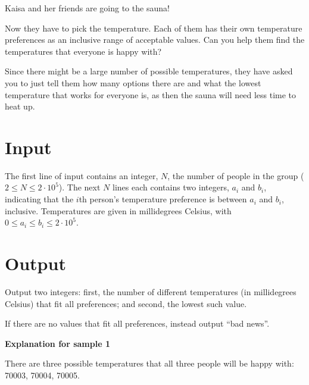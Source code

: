 
Kaisa and her friends are going to the sauna!

Now they have to pick the temperature. Each of them has their own temperature
preferences as an inclusive range of acceptable values. Can you help them find
the temperatures that everyone is happy with?

Since there might be a large number of possible temperatures, they have asked
you to just tell them how many options there are and what the lowest temperature
that works for everyone is, as then the sauna will need less time to heat up.

\section*{Input}

The first line of input contains an integer, $N$, the number of people in the group ($2 \le N \le 2 \cdot 10^5$).
The next $N$ lines each contains two integers, $a_i$ and $b_i$, indicating that
the $i$th person's temperature preference is between $a_i$ and $b_i$, inclusive. 
Temperatures are given in millidegrees Celsius, with $0 \le a_i \le b_i \le 2 \cdot 10^5$.

\section*{Output}

Output two integers: first, the number of different temperatures (in millidegrees
Celsius) that fit all preferences; and second, the lowest such value.

If there are no values that fit all preferences, instead output ``bad news''.

\textbf{Explanation for sample 1}

There are three possible temperatures that all three people will be
happy with: 70003, 70004, 70005.

